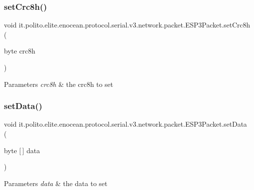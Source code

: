 \subsubsection{\texorpdfstring{set\+Crc8h()}{setCrc8h()}}
{\footnotesize\ttfamily void it.\+polito.\+elite.\+enocean.\+protocol.\+serial.\+v3.\+network.\+packet.\+E\+S\+P3\+Packet.\+set\+Crc8h (\begin{DoxyParamCaption}\item[{byte}]{crc8h }\end{DoxyParamCaption})}


\begin{DoxyParams}{Parameters}
{\em crc8h} & the crc8h to set \\
\hline
\end{DoxyParams}
\hypertarget{classit_1_1polito_1_1elite_1_1enocean_1_1protocol_1_1serial_1_1v3_1_1network_1_1packet_1_1_e_s_p3_packet_a01ada0590b49b1ec319ac6f64e274f18}{}\label{classit_1_1polito_1_1elite_1_1enocean_1_1protocol_1_1serial_1_1v3_1_1network_1_1packet_1_1_e_s_p3_packet_a01ada0590b49b1ec319ac6f64e274f18} 
\subsubsection{\texorpdfstring{set\+Data()}{setData()}}
{\footnotesize\ttfamily void it.\+polito.\+elite.\+enocean.\+protocol.\+serial.\+v3.\+network.\+packet.\+E\+S\+P3\+Packet.\+set\+Data (\begin{DoxyParamCaption}\item[{byte \mbox{[}$\,$\mbox{]}}]{data }\end{DoxyParamCaption})}


\begin{DoxyParams}{Parameters}
{\em data} & the data to set \\
\hline
\end{DoxyParams}
\hypertarget{classit_1_1polito_1_1elite_1_1enocean_1_1protocol_1_1serial_1_1v3_1_1network_1_1packet_1_1_e_s_p3_packet_abb7ac67c7e00306fefd4f84a2353a3f8}{}\label{classit_1_1polito_1_1elite_1_1enocean_1_1protocol_1_1serial_1_1v3_1_1network_1_1packet_1_1_e_s_p3_packet_abb7ac67c7e00306fefd4f84a2353a3f8} 
